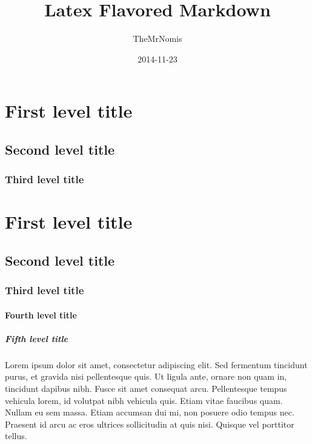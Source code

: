 \documentclass{report}
\begin{document}
    \begin{titlepage}
        \author{TheMrNomis}
        \title{Latex Flavored Markdown}
        \date{2014-11-23}

        \maketitle
    \end{titlepage}
    
    

\section{First level title}

\subsection{Second level title}

\subsubsection{Third level title}

\section{First level title}

\subsection{Second level title}

\subsubsection{Third level title}

\paragraph{Fourth level title}

\subparagraph{Fifth level title}

Lorem ipsum dolor sit amet, consectetur adipiscing elit. Sed fermentum tincidunt purus, et gravida nisi pellentesque quis. Ut ligula ante, ornare non quam in, tincidunt dapibus nibh. Fusce sit amet consequat arcu. Pellentesque tempus vehicula lorem, id volutpat nibh vehicula quis. Etiam vitae faucibus quam. Nullam eu sem massa. Etiam accumsan dui mi, non posuere odio tempus nec. Praesent id arcu ac eros ultrices sollicitudin at quis nisi. Quisque vel porttitor tellus.
\end{document}
